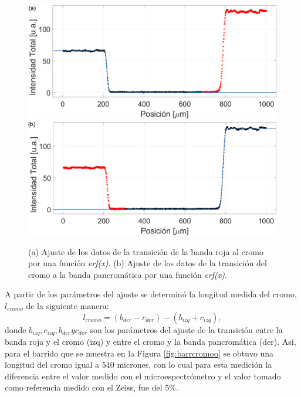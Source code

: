 \begin{figure}[H]
\hfill%
\includegraphics[scale=0.25]{Figs/microespectrometro/ajustebarrladoizq.png}
\hfill%
\includegraphics[scale=0.25]{Figs/microespectrometro/ajustebarrladoder.png}
\hfill%
\hfill%
\caption{(a) Ajuste de los datos de la transición de la banda roja al cromo por una función \textit{erf(x)}. (b) Ajuste de los datos de la transición del cromo a la banda pancromática por una función \textit{erf(x)}.}
\label{fig:ajustess}
\end{figure}

A partir de los parámetros del ajuste se determinó la longitud medida del cromo, $l_{cromo}$ de la siguiente manera:
\begin{equation}
l_{cromo} = (b_{der} - c_{der}) - (b_{izq} + c_{izq}),
\end{equation}
donde $b_{izq}, c_{izq}, b_{der} yc_{der}$ son los parámetros del ajuste de la transición entre la banda roja y el cromo (izq) y entre el cromo y la banda pancromática (der). Así, para el barrido que se muestra en la Figura \ref{fig:barrcromoo} se obtuvo una longitud del cromo igual a 540 micrones, con lo cual para esta medición la diferencia entre el valor medido con el microespectrómetro y el valor tomado como referencia medido con el Zeiss, fue del 5\%.

